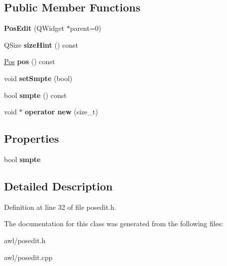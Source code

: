 \subsection*{Public Member Functions}
\begin{DoxyCompactItemize}
\item 
\mbox{\label{class_awl_1_1_pos_edit_a4fdce367dc289fe8b20f87c2e5d58d72}} 
{\bfseries Pos\+Edit} (Q\+Widget $\ast$parent=0)
\item 
\mbox{\label{class_awl_1_1_pos_edit_aa8aea9db693e9d0436c8d9cd89c8243f}} 
Q\+Size {\bfseries size\+Hint} () const
\item 
\mbox{\label{class_awl_1_1_pos_edit_a6a85cda150a660869c168768b35877fb}} 
\hyperlink{class_ms_1_1_pos}{Pos} {\bfseries pos} () const
\item 
\mbox{\label{class_awl_1_1_pos_edit_a15596dfaef67811e745db803261ec4eb}} 
void {\bfseries set\+Smpte} (bool)
\item 
\mbox{\label{class_awl_1_1_pos_edit_ae1b897cfe5bdc56a859a1277cc6360ae}} 
bool {\bfseries smpte} () const
\item 
\mbox{\label{class_awl_1_1_pos_edit_ad38a90a582447507c5a6ec45ce53d592}} 
void $\ast$ {\bfseries operator new} (size\+\_\+t)
\end{DoxyCompactItemize}
\subsection*{Properties}
\begin{DoxyCompactItemize}
\item 
\mbox{\label{class_awl_1_1_pos_edit_ae905435ec9bc92d8ca4418d9c8b97041}} 
bool {\bfseries smpte}
\end{DoxyCompactItemize}


\subsection{Detailed Description}


Definition at line 32 of file posedit.\+h.



The documentation for this class was generated from the following files\+:\begin{DoxyCompactItemize}
\item 
awl/posedit.\+h\item 
awl/posedit.\+cpp\end{DoxyCompactItemize}
